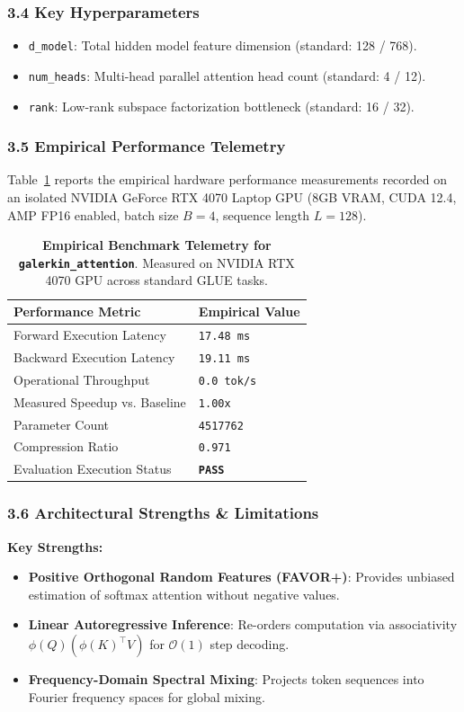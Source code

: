 \subsubsection*{3.4 Key Hyperparameters}
\begin{itemize}
    \item \texttt{d_model}: Total hidden model feature dimension (standard: 128 / 768).
    \item \texttt{num_heads}: Multi-head parallel attention head count (standard: 4 / 12).
    \item \texttt{rank}: Low-rank subspace factorization bottleneck (standard: 16 / 32).
\end{itemize}

\subsubsection*{3.5 Empirical Performance Telemetry}
Table~\ref{tab:telemetry_galerkin\_attention} reports the empirical hardware performance measurements recorded on an isolated NVIDIA GeForce RTX 4070 Laptop GPU (8GB VRAM, CUDA 12.4, AMP FP16 enabled, batch size $B=4$, sequence length $L=128$).

\begin{table}[h]
\centering
\small
\caption{\textbf{Empirical Benchmark Telemetry for \texttt{galerkin\_attention}}. Measured on NVIDIA RTX 4070 GPU across standard GLUE tasks.}
\label{tab:telemetry_galerkin\_attention}
\begin{tabularx}{\columnwidth}{lX}
\toprule
\textbf{Performance Metric} & \textbf{Empirical Value} \\
\midrule
Forward Execution Latency & \texttt{17.48 ms} \\
Backward Execution Latency & \texttt{19.11 ms} \\
Operational Throughput & \texttt{0.0 tok/s} \\
Measured Speedup vs. Baseline & \texttt{1.00x} \\
Parameter Count & \texttt{4517762} \\
Compression Ratio & \texttt{0.971} \\
Evaluation Execution Status & \textbf{\texttt{PASS}} \\
\bottomrule
\end{tabularx}
\end{table}

\subsubsection*{3.6 Architectural Strengths \& Limitations}
\textbf{Key Strengths:}
\begin{itemize}
    \item \textbf{Positive Orthogonal Random Features (FAVOR+)}: Provides unbiased estimation of softmax attention without negative values.
    \item \textbf{Linear Autoregressive Inference}: Re-orders computation via associativity $\phi(Q) (\phi(K)^\top V)$ for $\mathcal{O}(1)$ step decoding.
    \item \textbf{Frequency-Domain Spectral Mixing}: Projects token sequences into Fourier frequency spaces for global mixing.
\end{itemize}

